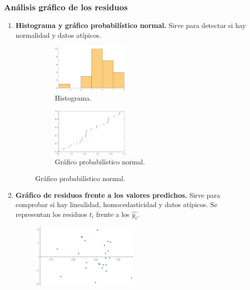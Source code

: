 \subsubsection{Análisis gráfico de los residuos}
\begin{enumerate}
    \item \textbf{Histograma y gráfico probabilístico normal.}
          Sirve para detectar si hay normalidad y datos atípicos.
          \begin{figure}[H]
              \begin{subfigure}[b]{0.45\textwidth}
                  \centering
                  \includegraphics[width=0.45\textwidth]{imagenes2/histograma.png}
                  \caption{Histograma.}
              \end{subfigure}
              \begin{subfigure}[b]{0.45\textwidth}
                  \centering
                  \includegraphics[width=0.45\textwidth]{imagenes2/probabilityplot.png}
                  \caption{Gráfico probabilístico normal.}
              \end{subfigure}
          \end{figure}
    \item \textbf{Gráfico de residuos frente a los valores predichos.}
          Sirve para comprobar si hay linealidad, homocedasticidad y datos atípicos.
          Se representan los residuos $t_i$ frente a los $\widehat{y_i}$.
          \begin{figure}[H]
              \centering
              \includegraphics[width=0.5\textwidth]{imagenes2/resfrentepred.png}

\end{figure}
\end{enumerate}
